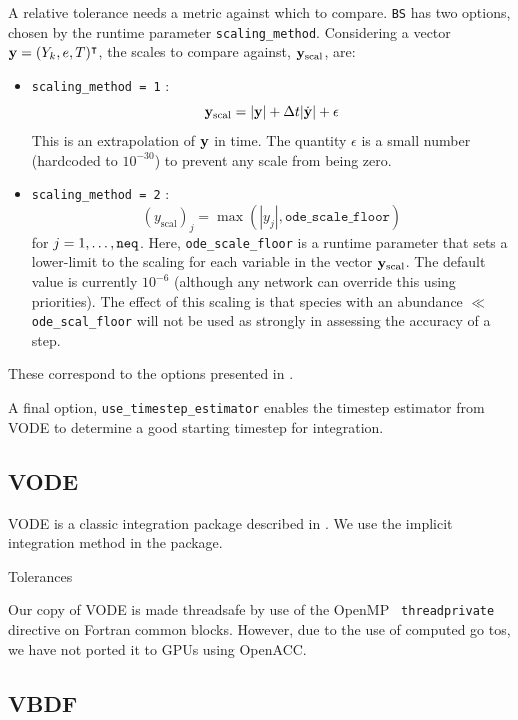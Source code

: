A relative tolerance needs a metric against which to compare.  {\tt BS}
has two options, chosen by the runtime parameter {\tt scaling\_method}.
Considering a vector ${\bf y} = (Y_k, e, T)^\intercal$, the scales
to compare against, ${\bf y}_\mathrm{scal}$, are:
\begin{itemize}
\item {\tt scaling\_method = 1} :
\begin{equation}
{\bf y}_\mathrm{scal} = |{\bf y}| + \Delta t  |\dot{\bf y}| + \epsilon
\end{equation}
This is an extrapolation of ${\bf y}$ in time.  The quantity
$\epsilon$ is a small number (hardcoded to $10^{-30}$) to prevent any
scale from being zero.


\item{\tt scaling\_method = 2} :
\begin{equation}
({y}_\mathrm{scal})_j = \max \left (|y_j|, \mathtt{ode\_scale\_floor} \right )
\end{equation}
for $j = 1, \ldots, {\tt neq}$.  Here, {\tt ode\_scale\_floor} is a runtime
parameter that sets a lower-limit to the scaling for each variable in the
vector ${\bf y}_\mathrm{scal}$.  The default value is currently $10^{-6}$
(although any network can override this using priorities).  The effect of
this scaling is that species with an abundance $\ll$ {\tt ode\_scal\_floor}
will not be used as strongly in assessing the accuracy of a step.

\end{itemize}
These correspond to the options presented in \cite{NR}.

A final option, {\tt use\_timestep\_estimator} enables the
timestep estimator from VODE to determine a good starting
timestep for integration.

\subsection{VODE}
\label{sec:VODE}

VODE is a classic integration package described in \cite{vode}.  We use the implicit integration method in the package.

Tolerances

Our copy of VODE is made threadsafe by use of the OpenMP {\tt
  threadprivate} directive on Fortran common blocks.  However, due to
the use of computed go tos, we have not ported it to GPUs using
OpenACC.



\subsection{VBDF}
\label{sec:VBDF}

